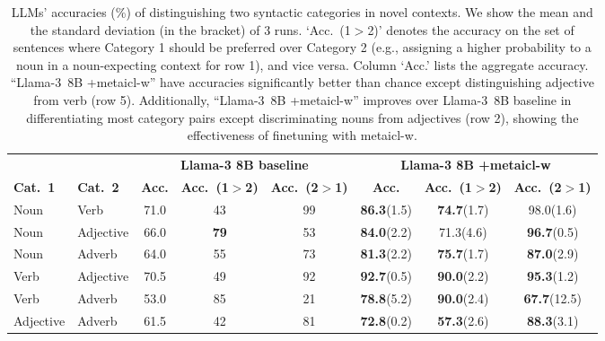 \documentclass{article}
\begin{document}
\begin{table*}[t]
\small
\begin{center}
\begin{tabular}{ll|ccc|ccc}
\toprule
\multicolumn{2}{c|}{} & \multicolumn{3}{c|}{\bf Llama-3 8B baseline} & \multicolumn{3}{c}{\bf Llama-3 8B +\ac{metaicl-w}} \\
\bf Cat.\ 1 & \bf Cat.\ 2 & \bf Acc. & \bf Acc.\ (1$>$2) & \bf Acc.\ (2$>$1) & \bf Acc. & \bf Acc.\ (1$>$2) & \bf Acc.\ (2$>$1) \\
\midrule
Noun       & Verb       & 71.0 &            43 &            99 & \textbf{86.3}(1.5) & \textbf{74.7}(1.7) &          98.0(1.6) \\
Noun       & Adjective  & 66.0 &   \textbf{79} &            53 & \textbf{84.0}(2.2) &          71.3(4.6) & \textbf{96.7}(0.5) \\
Noun       & Adverb     & 64.0 &            55 &            73 & \textbf{81.3}(2.2) & \textbf{75.7}(1.7) & \textbf{87.0}(2.9) \\
Verb       & Adjective  & 70.5 &            49 &            92 & \textbf{92.7}(0.5) & \textbf{90.0}(2.2) & \textbf{95.3}(1.2) \\
Verb       & Adverb     & 53.0 &            85 &            21 & \textbf{78.8}(5.2) & \textbf{90.0}(2.4) & \textbf{67.7}(12.5) \\
Adjective  & Adverb     & 61.5 &            42 &            81 & \textbf{72.8}(0.2) & \textbf{57.3}(2.6) & \textbf{88.3}(3.1) \\
\bottomrule
\end{tabular}
\end{center}
\caption{LLMs' accuracies (\%) of distinguishing two syntactic categories in novel contexts.
We show the mean and the standard deviation (in the bracket) of 3 runs.
`Acc.\ (1$>$2)' denotes the accuracy on the set of sentences where Category 1 should be preferred over Category 2 (e.g., assigning a higher probability to a noun in a noun-expecting context for row 1), and vice versa. Column `Acc.' lists the aggregate accuracy. ``\mbox{Llama-3 8B} +\ac{metaicl-w}'' have accuracies significantly better than chance except distinguishing adjective from verb (row 5). Additionally, ``\mbox{Llama-3 8B} +\ac{metaicl-w}'' improves over \mbox{Llama-3 8B} baseline in differentiating most category pairs except discriminating nouns from adjectives (row 2), showing the effectiveness of finetuning with \ac{metaicl-w}.}
\label{tab:category-classification-llama}
\end{table*}
\end{document}

